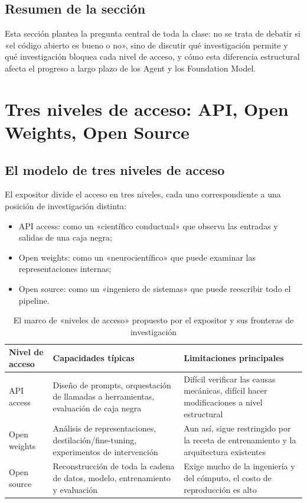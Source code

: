 \documentclass[a4paper]{article}
\begin{document}
\subsection{Resumen de la sección}
Esta sección plantea la pregunta central de toda la clase: no se trata de debatir si «el código abierto es bueno o no», sino de discutir qué investigación permite y qué investigación bloquea cada nivel de acceso, y cómo esta diferencia estructural afecta el progreso a largo plazo de los Agent y los Foundation Model.

\section{Tres niveles de acceso: API, Open Weights, Open Source}

\subsection{El modelo de tres niveles de acceso}
El expositor divide el acceso en tres niveles, cada uno correspondiente a una posición de investigación distinta:
\begin{itemize}
    \item API access: como un «científico conductual» que observa las entradas y salidas de una caja negra;
    \item Open weights: como un «neurocientífico» que puede examinar las representaciones internas;
    \item Open source: como un «ingeniero de sistemas» que puede reescribir todo el pipeline.
\end{itemize}

\begin{table}[H]
\centering
\begin{tabular}{p{2.4cm}p{4.2cm}p{4.8cm}}
\toprule
\textbf{Nivel de acceso} & \textbf{Capacidades típicas} & \textbf{Limitaciones principales} \\
\midrule
API access & Diseño de prompts, orquestación de llamadas a herramientas, evaluación de caja negra & Difícil verificar las causas mecánicas, difícil hacer modificaciones a nivel estructural \\
Open weights & Análisis de representaciones, destilación/fine-tuning, experimentos de intervención & Aun así, sigue restringido por la receta de entrenamiento y la arquitectura existentes \\
Open source & Reconstrucción de toda la cadena de datos, modelo, entrenamiento y evaluación & Exige mucho de la ingeniería y del cómputo, el costo de reproducción es alto \\
\bottomrule
\end{tabular}
\caption{El marco de «niveles de acceso» propuesto por el expositor y sus fronteras de investigación}
\end{table}
\end{document}
